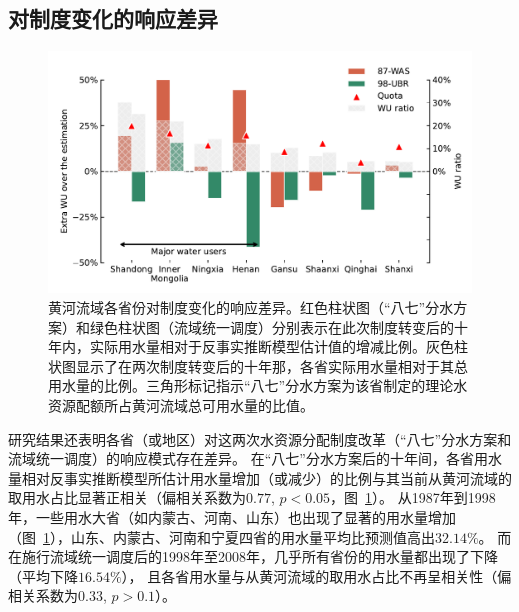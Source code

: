 \subsection{对制度变化的响应差异}\label{result-3}

\begin{figure}[!htb]
	\includegraphics[width=\textwidth]{img/ch5/fig3.pdf}
	\caption[黄河流域各省份对制度变化的响应差异]{黄河流域各省份对制度变化的响应差异。红色柱状图（“八七”分水方案）和绿色柱状图（流域统一调度）分别表示在此次制度转变后的十年内，实际用水量相对于反事实推断模型估计值的增减比例。灰色柱状图显示了在两次制度转变后的十年那，各省实际用水量相对于其总用水量的比例。三角形标记指示“八七”分水方案为该省制定的理论水资源配额所占黄河流域总可用水量的比值。}\label{fig:regulating}
\end{figure}

研究结果还表明各省（或地区）对这两次水资源分配制度改革（“八七”分水方案和流域统一调度）的响应模式存在差异。
在“八七”分水方案后的十年间，各省用水量相对反事实推断模型所估计用水量增加（或减少）的比例与其当前从黄河流域的取用水占比显著正相关（偏相关系数为$0.77$, $p<0.05$，图~\ref{fig:regulating}）。
从1987年到1998年，一些用水大省（如内蒙古、河南、山东）也出现了显著的用水量增加（图~\ref{fig:regulating}），山东、内蒙古、河南和宁夏四省的用水量平均比预测值高出$32.14\%$。
而在施行流域统一调度后的1998年至2008年，几乎所有省份的用水量都出现了下降（平均下降$16.54\%$），
且各省用水量与从黄河流域的取用水占比不再呈相关性（偏相关系数为$0.33$, $p>0.1$）。
